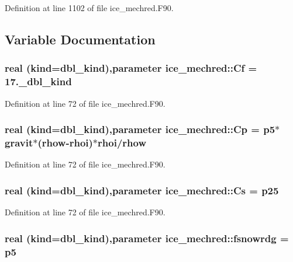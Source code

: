 Definition at line 1102 of file ice\_\-mechred.F90.

\subsection{Variable Documentation}
\hypertarget{namespaceice__mechred_ae649373b3c64951beea9cf6d3436124a}{
\subsubsection[{Cf}]{\setlength{\rightskip}{0pt plus 5cm}real (kind=dbl\_\-kind),parameter {\bf ice\_\-mechred::Cf} = 17.\_\-dbl\_\-kind}}
\label{namespaceice__mechred_ae649373b3c64951beea9cf6d3436124a}


Definition at line 72 of file ice\_\-mechred.F90.\hypertarget{namespaceice__mechred_ae1333fb1d2c19a54662644143d18489c}{
\subsubsection[{Cp}]{\setlength{\rightskip}{0pt plus 5cm}real (kind=dbl\_\-kind),parameter {\bf ice\_\-mechred::Cp} = p5$\ast$gravit$\ast$(rhow-\/rhoi)$\ast$rhoi/rhow}}
\label{namespaceice__mechred_ae1333fb1d2c19a54662644143d18489c}


Definition at line 72 of file ice\_\-mechred.F90.\hypertarget{namespaceice__mechred_a0cca318f045e71a7ff69619f4186399c}{
\subsubsection[{Cs}]{\setlength{\rightskip}{0pt plus 5cm}real (kind=dbl\_\-kind),parameter {\bf ice\_\-mechred::Cs} = p25}}
\label{namespaceice__mechred_a0cca318f045e71a7ff69619f4186399c}


Definition at line 72 of file ice\_\-mechred.F90.\hypertarget{namespaceice__mechred_a528a8cc57e3a5cb9d679d26baa6cec27}{
\subsubsection[{fsnowrdg}]{\setlength{\rightskip}{0pt plus 5cm}real (kind=dbl\_\-kind),parameter {\bf ice\_\-mechred::fsnowrdg} = p5}}
\label{namespaceice__mechred_a528a8cc57e3a5cb9d679d26baa6cec27}


